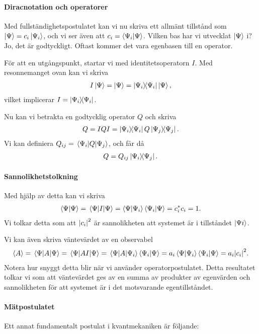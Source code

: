 \paragraph{Diracnotation och operatorer}
Med fullständighetspostulatet kan vi nu skriva ett allmänt tillstånd som $\ket{\Psi} = c_{i}\ket{\Psi_{i}}$, och vi ser även att $c_{i} = \braket{\Psi_{i}}{\Psi}$. Vilken bas har vi utvecklat $\ket{\Psi}$ i? Jo, det är godtyckligt. Oftast kommer det vara egenbasen till en operator.

För att en utgångspunkt, startar vi med identitetsoperatorn $I$. Med resonnemanget ovan kan vi skriva
\begin{align*}
	I\ket{\Psi} = \ket{\Psi} = \op{\Psi_{i}}{\Psi_{i}}\ket{\Psi},
\end{align*}
vilket implicerar $I = \op{\Psi_{i}}{\Psi_{i}}$.

Nu kan vi betrakta en godtycklig operator $Q$ och skriva
\begin{align*}
	Q = IQI = \op{\Psi_{i}}{\Psi_{i}}Q\op{\Psi_{j}}{\Psi_{j}}.
\end{align*}
Vi kan definiera $Q_{ij} = \mel{\Psi_{i}}{Q}{\Psi_{j}}$, och får då
\begin{align*}
	Q = Q_{ij}\op{\Psi_{i}}{\Psi_{j}}.
\end{align*}

\paragraph{Sannolikhetstolkning}
Med hjälp av detta kan vi skriva
\begin{align*}
	\braket{\Psi} = \ev{I}{\Psi} = \braket{\Psi}{\Psi_{i}}\braket{\Psi_{i}}{\Psi} = \cc{c_{i}}c_{i} = 1.
\end{align*}
Vi tolkar detta som att $\abs{c_{i}}^{2}$ är sannolikheten att systemet är i tillståndet $\ket{\Psi{i}}$.

Vi kan även skriva väntevärdet av en observabel
\begin{align*}
	\expval{A} = \ev{A}{\Psi} = \ev{AI}{\Psi} = \mel{\Psi}{A}{\Psi_{i}}\braket{\Psi_{i}}{\Psi} = a_{i}\braket{\Psi}{\Psi_{i}}\braket{\Psi_{i}}{\Psi} = a_{i}\abs{c_{i}}^{2}.
\end{align*}
Notera hur snyggt detta blir när vi använder operatorpostulatet. Detta resultatet tolkar vi som att väntevärdet ges av en summa av produkter av egenvärden och sannolikheten för att systemet är i det motsvarande egentillståndet.

\paragraph{Mätpostulatet}
Ett annat fundamentalt postulat i kvantmekaniken är följande:

